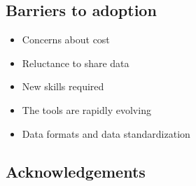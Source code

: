 \documentclass[a0, landscape]{a0poster}
\begin{document}
\begin{multicols}{3}

\color{SaddleBrown} %
\section*{Barriers to adoption}
\begin{itemize}
    \item Concerns about cost
    \item Reluctance to share data
    \item New skills required
    \item The tools are rapidly evolving
    \item Data formats and data standardization
\end{itemize}

\color{DarkSlateGray} %


\nocite{*} %
\footnotesize  %

\subsection*{Acknowledgements} \footnotesize


\end{multicols}
\end{document}
